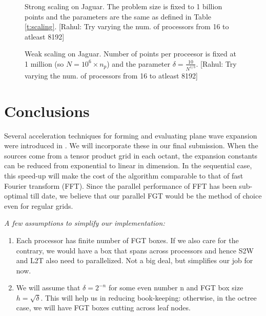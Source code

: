 \documentclass[conference]{IEEEtran}
\begin{document}
\begin{figure}
	\begin{center}
	\end{center}
\caption{Strong scaling on Jaguar. The problem size is fixed to 1 billion points and the parameters are the same as defined in Table \ref{t:scaling}. [Rahul: Try varying the num. of processors from 16 to atleast 8192]}
\label{f:fixed}
\end{figure}

\begin{figure}
	\begin{center}
	\end{center}
\caption{Weak scaling on Jaguar. Number of points per proceesor is fixed at 1 million (so $N = 10^6 \times n_p$) and the parameter $\delta = \frac{10}{N^{1/3}}$. [Rahul: Try varying the num. of processors from 16 to atleast 8192]}
\label{f:iso}
\end{figure}



\section{Conclusions}

Several acceleration techniques for forming and evaluating plane wave expansion were introduced in \cite{fggt}. We will incorporate these in our final submission. When the sources come from a tensor product grid in each octant, the expansion constants can be reduced from exponential to linear in dimension. In the sequential case, this speed-up will make the cost of the algorithm comparable to that of fast Fourier transform (FFT). Since the parallel performance of FFT has been sub-optimal till date, we believe that our parallel FGT would be the method of choice even for regular grids. 


{\em
A few assumptions to simplify our implementation: 
\begin{enumerate}
\item Each processor has finite number of FGT boxes. If we also care for the contrary, we would have a box that spans across processors and hence S2W and L2T also need to parallelized. Not a big deal, but simplifies our job for now. 
\item We will assume that $\delta = 2^{-n}$ for some even number n and FGT box size $h = \sqrt{\delta}$. This will help us in reducing book-keeping: otherwise, in the octree case, we will have FGT boxes cutting across leaf nodes. 
\end{enumerate}
}




\end{document}
